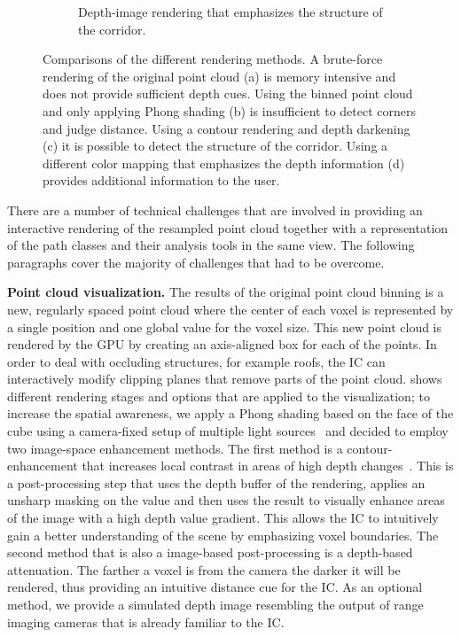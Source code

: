 \begin{figure}
\begin{subfigure}[b]{0.21\textwidth}
    \caption{Depth-image rendering that emphasizes the structure of the corridor.}
    \label{contributions:usar:rendering:depth}
\end{subfigure}
\caption{Comparisons of the different rendering methods.  A brute-force rendering of the original point cloud (a) is memory intensive and does not provide sufficient depth cues.  Using the binned point cloud and only applying Phong shading (b) is insufficient to detect corners and judge distance.  Using a contour rendering and depth darkening (c) it is possible to detect the structure of the corridor.  Using a different color mapping that emphasizes the depth information (d) provides additional information to the user.}
\label{contributions:usar:rendering}
\end{figure}

There are a number of technical challenges that are involved in providing an interactive rendering of the resampled point cloud together with a representation of the path classes and their analysis tools in the same view.  The following paragraphs cover the majority of challenges that had to be overcome.

\textbf{Point cloud visualization. }  The results of the original point cloud binning is a new, regularly spaced point cloud where the center of each voxel is represented by a single  position and one global value for the voxel size.  This new point cloud is rendered by the GPU by creating an axis-aligned box for each of the points.  In order to deal with occluding structures, for example roofs, the IC can interactively modify clipping planes that remove parts of the point cloud.   shows different rendering stages and options that are applied to the visualization; to increase the spatial awareness, we apply a Phong shading based on the face of the cube using a camera-fixed setup of multiple light sources~\cite{phong1975illumination} and decided to employ two image-space enhancement methods.  The first method is a contour-enhancement that increases local contrast in areas of high depth changes~\cite{luft2006image}.  This is a post-processing step that uses the depth buffer of the rendering, applies an unsharp masking on the value and then uses the result to visually enhance areas of the image with a high depth value gradient.  This allows the IC to intuitively gain a better understanding of the scene by emphasizing voxel boundaries.  The second method that is also a image-based post-processing is a depth-based attenuation.  The farther a voxel is from the camera the darker it will be rendered, thus providing an intuitive distance cue for the IC.  As an optional method, we provide a simulated depth image resembling the output of range imaging cameras that is already familiar to the IC.

